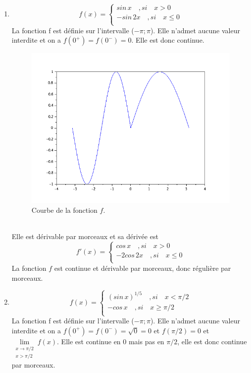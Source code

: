 \documentclass[a4paper,12pt]{report}
\begin{document}
\begin{enumerate}
	\item \[f(x)=
  \left\{
      \begin{aligned}
        sin\,x\quad , si\quad x > 0\\
        -sin\,2x\quad ,si\quad x \le 0\\
      \end{aligned}
    \right.\]
	La fonction f est définie sur l'intervalle ($-\pi;\pi$). Elle n'admet aucune valeur interdite et on a $f(0^+)=f(0^-)=0$. Elle est donc continue.
	\begin{figure}[h!]
		\centering
		\includegraphics[scale=0.6]{ex2_fig4.png}
		\caption{\label{figure4}Courbe de la fonction $f$.}
		\end{figure}
		\\
	Elle est d\'erivable par morceaux et sa d\'eriv\'ee est \[f'(x)=
  \left\{
      \begin{aligned}
        cos\,x\quad , si\quad x > 0\\
        -2cos\,2x\quad ,si\quad x \le 0\\
      \end{aligned}
    \right.\]
	La fonction $f$ est continue et d\'erivable par morceaux, donc r\'eguli\`ere par morceaux.
	\newpage
	\item \[f(x)=
  \left\{
      \begin{aligned}
        (sin\,x)^{1/5}\quad , si\quad x < \pi/2\\
        -cos\,x\quad ,si\quad x \ge \pi/2\\
      \end{aligned}
    \right.\]
	La fonction f est définie sur l'intervalle ($-\pi;\pi$). Elle n'admet aucune valeur interdite et on a $f(0^+)=f(0^-)=\sqrt{0}=0$ et $f(\pi/2)=0$ et $\lim\limits_{\substack{x \rightarrow \pi/2 \\ x>\pi/2}} f(x)$. Elle est continue en 0 mais pas en $\pi/2$, elle est donc continue par morceaux.

\end{enumerate}
\end{document}

